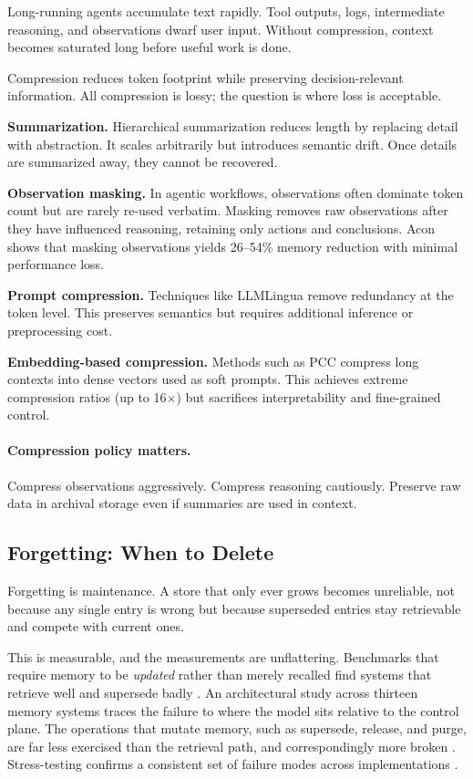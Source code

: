 Long-running agents accumulate text rapidly. Tool outputs, logs, intermediate reasoning, and observations dwarf user input. Without compression, context becomes saturated long before useful work is done.

Compression reduces token footprint while preserving decision-relevant information. All compression is lossy; the question is where loss is acceptable.

\textbf{Summarization.}
Hierarchical summarization \cite{wu2021recursively} reduces length by replacing detail with abstraction. It scales arbitrarily but introduces semantic drift. Once details are summarized away, they cannot be recovered.

\textbf{Observation masking.}
In agentic workflows, observations often dominate token count but are rarely re-used verbatim. Masking removes raw observations after they have influenced reasoning, retaining only actions and conclusions. Acon \cite{acon2025} shows that masking observations yields 26--54\% memory reduction with minimal performance loss.

\textbf{Prompt compression.}
Techniques like LLMLingua \cite{jiang2023llmlingua} remove redundancy at the token level. This preserves semantics but requires additional inference or preprocessing cost.

\textbf{Embedding-based compression.}
Methods such as PCC \cite{pcc2025} compress long contexts into dense vectors used as soft prompts. This achieves extreme compression ratios (up to 16$\times$) but sacrifices interpretability and fine-grained control.

\paragraph{Compression policy matters.}
Compress observations aggressively. Compress reasoning cautiously. Preserve raw data in archival storage even if summaries are used in context.

\subsection{Forgetting: When to Delete}

Forgetting is maintenance. A store that only ever grows becomes unreliable, not
because any single entry is wrong but because superseded entries stay retrievable
and compete with current ones.

This is measurable, and the measurements are unflattering. Benchmarks that require
memory to be \emph{updated} rather than merely recalled find systems that retrieve
well and supersede badly \cite{recallforget2026}. An architectural study across
thirteen memory systems traces the failure to where the model sits relative to the control plane. The operations that mutate memory, such as supersede, release, and purge, are far less exercised than the retrieval path, and correspondingly more broken \cite{controlplane2026}. Stress-testing confirms a consistent set of
failure modes across implementations \cite{memfail2026}.

